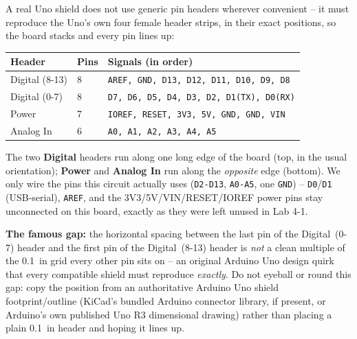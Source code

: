 \documentclass[11pt]{article}
\begin{document}
\begin{summary}
A real Uno shield does not use generic pin headers wherever convenient -- it
must reproduce the Uno's own four female header strips, in their exact
positions, so the board stacks and every pin lines up:
\begin{center}
\begin{tabular}{@{}p{3.0cm}p{1.3cm}p{9.6cm}@{}}
\toprule
\textbf{Header} & \textbf{Pins} & \textbf{Signals (in order)} \\
\midrule
Digital (8-13) & 8 & \texttt{AREF, GND, D13, D12, D11, D10, D9, D8} \\
Digital (0-7) & 8 & \texttt{D7, D6, D5, D4, D3, D2, D1(TX), D0(RX)} \\
Power & 7 & \texttt{IOREF, RESET, 3V3, 5V, GND, GND, VIN} \\
Analog In & 6 & \texttt{A0, A1, A2, A3, A4, A5} \\
\bottomrule
\end{tabular}
\end{center}
The two \textbf{Digital} headers run along one long edge of the board (top, in
the usual orientation); \textbf{Power} and \textbf{Analog In} run along the
\emph{opposite} edge (bottom). We only wire the pins this circuit actually
uses (\texttt{D2-D13}, \texttt{A0-A5}, one \texttt{GND}) -- \texttt{D0}/\texttt{D1}
(USB-serial), \texttt{AREF}, and the 3V3/5V/VIN/RESET/IOREF power pins stay
unconnected on this board, exactly as they were left unused in Lab 4-1.

\textbf{The famous gap:} the horizontal spacing between the last pin of the
Digital~(0-7) header and the first pin of the Digital~(8-13) header is
\emph{not} a clean multiple of the 0.1~in grid every other pin sits on -- an
original Arduino Uno design quirk that every compatible shield must reproduce
\emph{exactly}. Do not eyeball or round this gap: copy the position from an
authoritative Arduino Uno shield footprint/outline (KiCad's bundled Arduino
connector library, if present, or Arduino's own published Uno R3 dimensional
drawing) rather than placing a plain 0.1~in header and hoping it lines up.
\end{summary}
\end{document}
